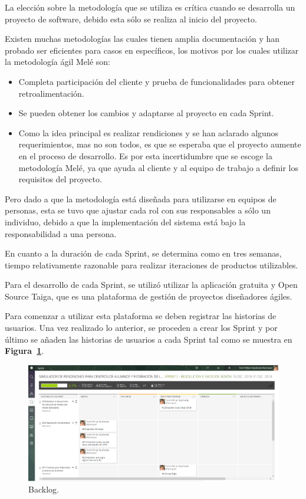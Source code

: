 La elección sobre la metodología que se utiliza es crítica cuando se desarrolla un proyecto de software, debido esta sólo se realiza al inicio del proyecto. 

Existen muchas metodologías las cuales tienen amplia documentación y han probado ser eficientes para casos en específicos, los motivos por los cuales utilizar la metodología ágil Melé son:

\begin{itemize}
    \item Completa participación del cliente y prueba de funcionalidades para obtener retroalimentación.

    \item Se pueden obtener los cambios y adaptarse al proyecto en cada Sprint.

    \item Como la idea principal es realizar rendiciones y se han aclarado algunos requerimientos, mas no son todos, es que se esperaba que el proyecto aumente en el proceso de desarrollo. Es por esta incertidumbre que se escoge la metodología Melé, ya que ayuda al cliente y al equipo de trabajo a definir los requisitos del proyecto.
\end{itemize}

Pero dado a que la metodología está diseñada para utilizarse en equipos de personas, esta se tuvo que ajustar cada rol con sus responsables a sólo un individuo, debido a que la implementación del sistema está bajo la responsabilidad a una persona.

En cuanto a la duración de cada Sprint, se determina como en tres semanas, tiempo relativamente razonable para realizar iteraciones de productos utilizables.

Para el desarrollo de cada Sprint, se utilizó utilizar la aplicación gratuita y Open Source Taiga, que es una plataforma de gestión de proyectos diseñadores ágiles.

Para comenzar a utilizar esta plataforma se deben registrar las historias de usuarios. Una vez realizado lo anterior, se proceden a crear los Sprint y por último se añaden las historias de usuarios a cada Sprint tal como se muestra en \textbf{Figura~\ref{fig: backlog}}.

\begin{figure}[h!]
    \includegraphics[width=\textwidth]{Imagenes/Kanban.png}
    \caption{\label{fig: backlog} Backlog.}
\end{figure}

